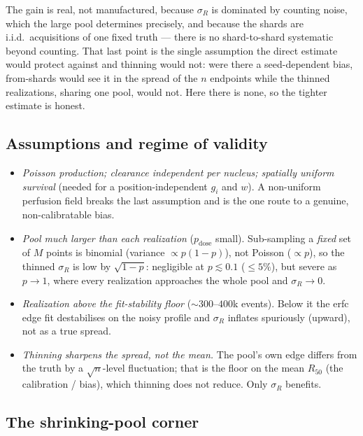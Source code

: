 \documentclass[11pt]{article}
\begin{document}
The gain is real, not manufactured, because $\sigma_R$ is dominated by counting
noise, which the large pool determines precisely, and because the shards are
i.i.d.\ acquisitions of one fixed truth --- there is no shard-to-shard systematic
beyond counting. That last point is the single assumption the direct estimate
would protect against and thinning would not: were there a seed-dependent bias,
from-shards would see it in the spread of the $n$ endpoints while the thinned
realizations, sharing one pool, would not. Here there is none, so the tighter
estimate is honest.

\subsection*{Assumptions and regime of validity}

\begin{itemize}
  \item \emph{Poisson production; clearance independent per nucleus; spatially
        uniform survival} (needed for a position-independent $g_i$ and $w$). A
        non-uniform perfusion field breaks the last assumption and is the one
        route to a genuine, non-calibratable bias.
  \item \emph{Pool much larger than each realization} ($p_{\mathrm{dose}}$
        small). Sub-sampling a \emph{fixed} set of $M$ points is binomial
        (variance $\propto p(1-p)$), not Poisson ($\propto p$), so the thinned
        $\sigma_R$ is low by $\sqrt{1-p}$: negligible at $p\lesssim0.1$
        ($\le5\%$), but severe as $p\to1$, where every realization approaches the
        whole pool and $\sigma_R\to0$.
  \item \emph{Realization above the fit-stability floor} ($\sim\!300$--$400$k
        events). Below it the erfc edge fit destabilises on the noisy profile and
        $\sigma_R$ inflates spuriously (upward), not as a true spread.
  \item \emph{Thinning sharpens the spread, not the mean.} The pool's own edge
        differs from the truth by a $\sqrt{n}$-level fluctuation; that is the
        floor on the mean $R_{50}$ (the calibration / bias), which thinning does
        not reduce. Only $\sigma_R$ benefits.
\end{itemize}

\subsection*{The shrinking-pool corner}
\end{document}
